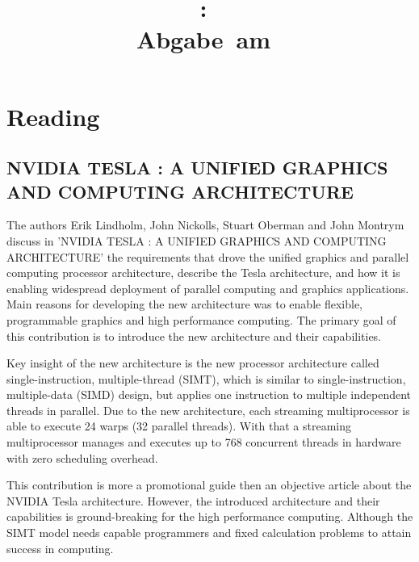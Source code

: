 \documentclass{article}
\title{
\vspace{2in}
\textmd{\textbf{\hmwkClass:\ \hmwkTitle}}\\
\normalsize\vspace{0.1in}\small{Abgabe\ am\ \hmwkDueDate}\\
\vspace{0.1in}\large{\textit{\hmwkClassTime}}
\vspace{3in}
}
\author{\textbf{\hmwkAuthorName}}
\date{} %
\newcommand{\enterProblemHeader}[1]{
}
\newcommand{\exitProblemHeader}[1]{
}
\newcounter{homeworkProblemCounter} %
\newcommand{\homeworkProblemName}{}
\newenvironment{homeworkProblem}[1][Problem \arabic{homeworkProblemCounter}]{ %
\stepcounter{homeworkProblemCounter} %
\renewcommand{\homeworkProblemName}{#1} %
\section{\homeworkProblemName} %
}{
}
\begin{document}
\maketitle


\newpage
\tableofcontents
\newpage


\begin{homeworkProblem}[Reading]
\subsection{NVIDIA TESLA : A UNIFIED GRAPHICS AND COMPUTING ARCHITECTURE}
The authors Erik Lindholm, John Nickolls, Stuart Oberman and John Montrym discuss in 
'NVIDIA TESLA : A UNIFIED GRAPHICS AND COMPUTING ARCHITECTURE' the requirements that
drove the unified graphics and parallel computing processor architecture, describe the 
Tesla architecture, and how it is enabling widespread deployment of parallel computing 
and graphics applications. Main reasons for developing the new architecture was to
enable flexible, programmable graphics and high performance computing. The primary
goal of this contribution is to introduce the new architecture and their capabilities.

Key insight of the new architecture is the new processor architecture called
single-instruction, multiple-thread (SIMT), which is similar to single-instruction,
multiple-data (SIMD) design, but applies one instruction to multiple independent 
threads in parallel. Due to the new architecture, each streaming multiprocessor 
is able to execute 24 warps (32 parallel threads). With that a streaming multiprocessor
manages and executes up to 768 concurrent threads in hardware with zero scheduling
overhead.

This contribution is more a promotional guide then an objective article about the NVIDIA 
Tesla architecture. However, the introduced architecture and their capabilities is 
ground-breaking for the high performance computing. Although the SIMT model needs
capable programmers and fixed calculation problems to attain success in computing.
\end{homeworkProblem}
\end{document}
